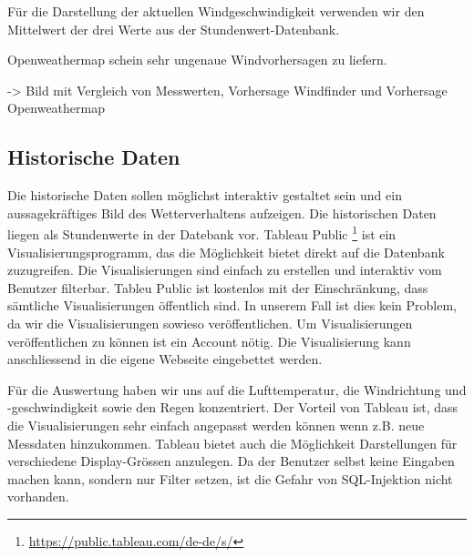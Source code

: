 Für die Darstellung der aktuellen Windgeschwindigkeit verwenden wir den Mittelwert der drei Werte aus der Stundenwert-Datenbank.

Openweathermap schein sehr ungenaue Windvorhersagen zu liefern.

-> Bild mit Vergleich von Messwerten, Vorhersage Windfinder und Vorhersage Openweathermap



\subsection{Historische Daten}
Die historische Daten sollen möglichst interaktiv gestaltet sein und ein aussagekräftiges Bild des Wetterverhaltens aufzeigen. Die historischen Daten liegen als Stundenwerte in der Datebank vor.
Tableau Public \footnote{ \url{https://public.tableau.com/de-de/s/}} ist ein Visualisierungsprogramm, das die Möglichkeit bietet direkt auf die Datenbank zuzugreifen. Die Visualisierungen sind einfach zu erstellen und interaktiv vom Benutzer filterbar.
Tableu Public ist kostenlos mit der Einschränkung, dass sämtliche Visualisierungen öffentlich sind. In unserem Fall ist dies kein Problem, da wir die Visualisierungen sowieso veröffentlichen. Um Visualisierungen veröffentlichen zu können ist ein Account nötig. Die Visualisierung kann anschliessend in die eigene Webseite eingebettet werden.

Für die Auswertung haben wir uns auf die Lufttemperatur, die Windrichtung und -geschwindigkeit sowie den Regen konzentriert.
Der Vorteil von Tableau ist, dass die Visualisierungen sehr einfach angepasst werden können wenn z.B. neue Messdaten hinzukommen. Tableau bietet auch die Möglichkeit Darstellungen für verschiedene Display-Grössen anzulegen. Da der Benutzer selbst keine Eingaben machen kann, sondern nur Filter setzen, ist die Gefahr von SQL-Injektion nicht vorhanden.







